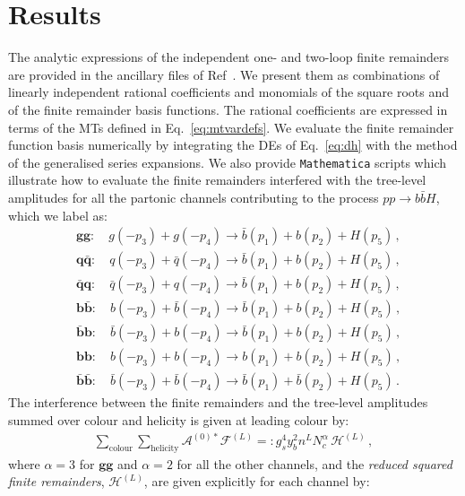 \documentclass[main.tex]{subfiles}
\begin{document}
\section{Results}
\label{Hbbsec:results}
The analytic expressions of the independent one- and two-loop finite remainders are provided in the ancillary files of Ref~\cite{Badger:2021ega}. We present them as combinations of linearly independent rational coefficients and monomials of the square roots and of the finite remainder basis functions. The rational coefficients are expressed in terms of the MTs defined in Eq.~\ref{eq:mtvardefs}. We evaluate the finite remainder function basis numerically by integrating the DEs of Eq.~\ref{eq:dh} with the method of the generalised series expansions. We also provide \texttt{Mathematica} scripts which illustrate how to evaluate the finite remainders interfered with the tree-level amplitudes for all the partonic channels contributing to the process $pp\to b\bar{b} H$, which we label as:
\begin{equation}
\label{eq:channel_definition}
\begin{aligned}
&\mathbf{gg}:       \quad  g(-p_3) + g(-p_4) \rightarrow \bar{b}(p_1) + b(p_2) + H(p_5) \,, \\
&\mathbf{q\bar{q}}: \quad  q(-p_3) + \bar{q}(-p_4) \rightarrow \bar{b}(p_1) + b(p_2) + H(p_5) \,, \\
&\mathbf{\bar{q}q}: \quad \bar{q}(-p_3) + q(-p_4) \rightarrow \bar{b}(p_1) + b(p_2) + H(p_5) \,, \\
&\mathbf{b\bar{b}}: \quad b(-p_3) + \bar{b}(-p_4) \rightarrow \bar{b}(p_1) + b(p_2) + H(p_5) \,, \\
&\mathbf{\bar{b}b}: \quad \bar{b}(-p_3) + b(-p_4) \rightarrow \bar{b}(p_1) + b(p_2) + H(p_5) \,, \\
&\mathbf{bb}: \quad b(-p_3) + b(-p_4) \rightarrow b(p_1) + b(p_2) + H(p_5) \,, \\
&\mathbf{\bar{b}\bar{b}}: \quad \bar{b}(-p_3) + \bar{b}(-p_4) \rightarrow \bar{b}(p_1) + \bar{b}(p_2) + H(p_5) \,.
\end{aligned}
\end{equation}
The interference between the finite remainders and the tree-level amplitudes summed over colour and helicity is given at leading colour by: 
\begin{align}
\sum_{\text{colour}} \sum_{\text{helicity}} \mathcal{A}^{(0) *} \mathcal{F}^{(L)} =: g_s^4 y_b^2 n^L N_c^{\alpha} \, \mathcal{H}^{(L)}\,,
\end{align}
where $\alpha=3$ for $\mathbf{gg}$ and $\alpha=2$ for all the other channels, and the \textit{reduced squared finite remainders}, $\mathcal{H}^{(L)}$, are given explicitly for each channel by:
\end{document}
